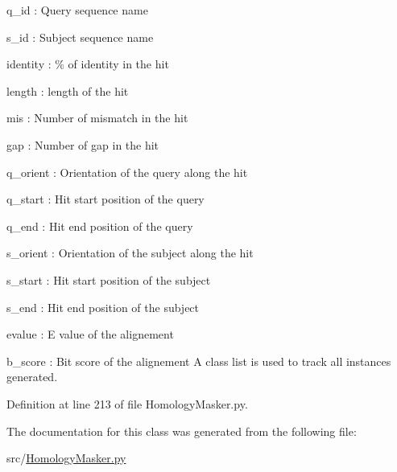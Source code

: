 \begin{DoxyItemize}
\item q\-\_\-id \-: Query sequence name
\item s\-\_\-id \-: Subject sequence name
\item identity \-: \% of identity in the hit
\item length \-: length of the hit
\item mis \-: Number of mismatch in the hit
\item gap \-: Number of gap in the hit
\item q\-\_\-orient \-: Orientation of the query along the hit
\item q\-\_\-start \-: Hit start position of the query
\item q\-\_\-end \-: Hit end position of the query
\item s\-\_\-orient \-: Orientation of the subject along the hit
\item s\-\_\-start \-: Hit start position of the subject
\item s\-\_\-end \-: Hit end position of the subject
\item evalue \-: E value of the alignement
\item b\-\_\-score \-: Bit score of the alignement A class list is used to track all instances generated. 
\end{DoxyItemize}

Definition at line 213 of file Homology\-Masker.\-py.



The documentation for this class was generated from the following file\-:\begin{DoxyCompactItemize}
\item 
src/\hyperlink{HomologyMasker_8py}{Homology\-Masker.\-py}\end{DoxyCompactItemize}
